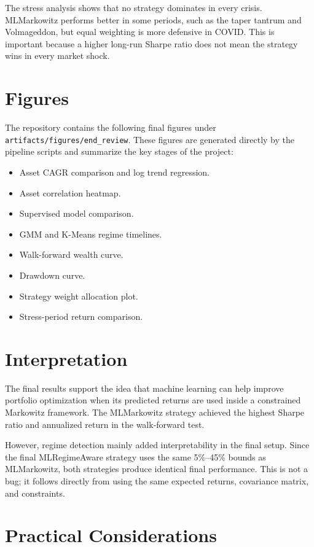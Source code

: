 \documentclass[11pt,a4paper]{article}
\begin{document}
The stress analysis shows that no strategy dominates in every crisis. MLMarkowitz performs better in some periods, such as the taper tantrum and Volmageddon, but equal weighting is more defensive in COVID. This is important because a higher long-run Sharpe ratio does not mean the strategy wins in every market shock.

\section{Figures}

The repository contains the following final figures under \texttt{artifacts/figures/end\_review}. These figures are generated directly by the pipeline scripts and summarize the key stages of the project:

\begin{itemize}[leftmargin=*]
    \item Asset CAGR comparison and log trend regression.
    \item Asset correlation heatmap.
    \item Supervised model comparison.
    \item GMM and K-Means regime timelines.
    \item Walk-forward wealth curve.
    \item Drawdown curve.
    \item Strategy weight allocation plot.
    \item Stress-period return comparison.
\end{itemize}

\section{Interpretation}

The final results support the idea that machine learning can help improve portfolio optimization when its predicted returns are used inside a constrained Markowitz framework. The MLMarkowitz strategy achieved the highest Sharpe ratio and annualized return in the walk-forward test.

However, regime detection mainly added interpretability in the final setup. Since the final MLRegimeAware strategy uses the same 5\%--45\% bounds as MLMarkowitz, both strategies produce identical final performance. This is not a bug; it follows directly from using the same expected returns, covariance matrix, and constraints.

\section{Practical Considerations}
\end{document}

